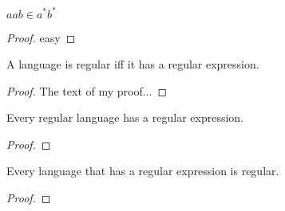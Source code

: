 %

\begin{theorem}\label{thm:regular_iff_regexp}
\leanok
$aab \in a^* b^*$
\end{theorem}
\begin{proof}
\leanok
easy
\end{proof}


\begin{theorem}\label{thm:regular_iff_regexp}
A language is regular iff it has a regular expression.
\end{theorem}
\begin{proof}
{}
The text of my proof...
\end{proof}

\begin{lemma}\label{lem:regular_impl_regexp}
Every regular language has a regular expression.
\end{lemma}
\begin{proof}
\end{proof}

\begin{lemma}\label{lem:regexp_impl_regular}
Every language that has a regular expression is regular.
\end{lemma}
\begin{proof}
\end{proof}
